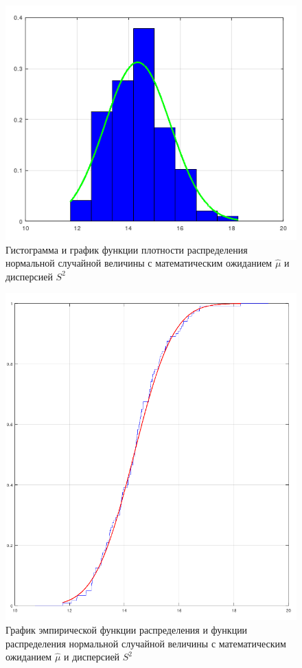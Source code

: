 \begin{figure}[H]
	\begin{center}
		\includegraphics[scale=0.8]{img/bar.png}
	\end{center}
	\captionsetup{justification=centering}
	\caption{Гистограмма и график функции плотности распределения нормальной случайной величины с математическим ожиданием $\hat\mu$ и дисперсией $S^2$}
	\label{img:bar}
\end{figure}

\begin{figure}[H]
	\begin{center}
		\includegraphics[scale=0.6]{img/graph.png}
	\end{center}
	\captionsetup{justification=centering}
	\caption{График эмпирической функции распределения и функции распределения нормальной случайной величины с математическим ожиданием $\hat\mu$ и дисперсией $S^2$}
	\label{img:graph}
\end{figure}